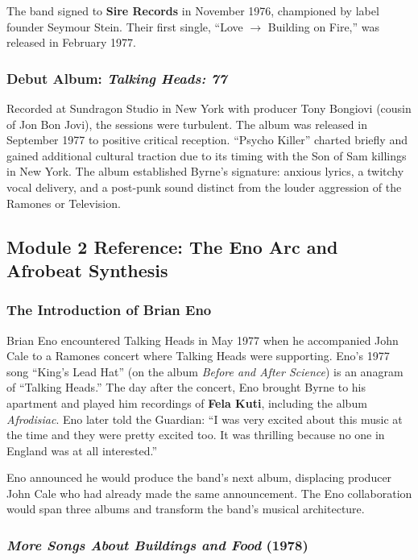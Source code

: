 \documentclass[11pt,letterpaper]{article}
\begin{document}
The band signed to \textbf{Sire Records} in November 1976, championed by label founder Seymour Stein. Their first single, ``Love $\to$ Building on Fire,'' was released in February 1977.

\subsubsection{Debut Album: \textit{Talking Heads: 77}}

Recorded at Sundragon Studio in New York with producer Tony Bongiovi (cousin of Jon Bon Jovi), the sessions were turbulent. The album was released in September 1977 to positive critical reception. ``Psycho Killer'' charted briefly and gained additional cultural traction due to its timing with the Son of Sam killings in New York. The album established Byrne's signature: anxious lyrics, a twitchy vocal delivery, and a post-punk sound distinct from the louder aggression of the Ramones or Television.

\subsection{Module 2 Reference: The Eno Arc and Afrobeat Synthesis}

\subsubsection{The Introduction of Brian Eno}

Brian Eno encountered Talking Heads in May 1977 when he accompanied John Cale to a Ramones concert where Talking Heads were supporting. Eno's 1977 song ``King's Lead Hat'' (on the album \textit{Before and After Science}) is an anagram of ``Talking Heads.'' The day after the concert, Eno brought Byrne to his apartment and played him recordings of \textbf{Fela Kuti}, including the album \textit{Afrodisiac}. Eno later told the Guardian: ``I was very excited about this music at the time and they were pretty excited too. It was thrilling because no one in England was at all interested.''

Eno announced he would produce the band's next album, displacing producer John Cale who had already made the same announcement. The Eno collaboration would span three albums and transform the band's musical architecture.

\subsubsection{\textit{More Songs About Buildings and Food} (1978)}
\end{document}
